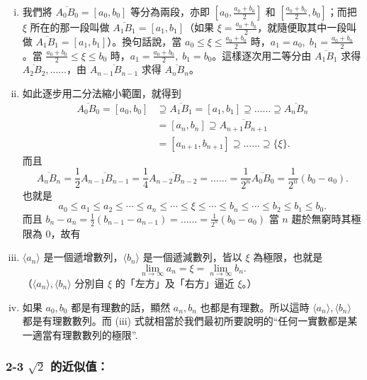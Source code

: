 \begin{enumerate}[(i)]
    \item 我們將 $\overline{A_0 B_0}=[a_0, b_0]$ 等分為兩段，亦即 $[a_0, \frac{a_0+b_0}{2}]$ 和 $[\frac{a_0+b_0}{2}, b_0]$；而把 $\xi$ 所在的那一段叫做 $\overline{A_1 B_1}=[a_1, b_1]$（如果 $\xi = \frac{a_0+b_0}{2}$，就隨便取其中一段叫做 $\overline{A_1 B_1}=[a_1, b_1]$）。換句話說，當 $a_0 \le \xi \le \frac{a_0+b_0}{2}$ 時，$a_1 = a_0,\; b_1 = \frac{a_0+b_0}{2}$。當 $\frac{a_0+b_0}{2} \le \xi \le b_0$ 時，$a_1 = \frac{a_0+b_0}{2},\; b_1 = b_0$。這樣逐次用二等分由 $\overline{A_1 B_1}$ 求得 $\overline{A_2 B_2}, \dots\dots$，由 $\overline{A_{n-1} B_{n-1}}$ 求得 $\overline{A_n B_n}$。
    \item 如此逐步用二分法縮小範圍，就得到
    \begin{align*}
    \overline{A_0 B_0} = [a_0, b_0] &\supseteq \overline{A_1 B_1} = [a_1, b_1] \supseteq \dots\dots \supseteq \overline{A_n B_n} \\
    &= [a_n, b_n] \supseteq \overline{A_{n+1} B_{n+1}} \\
    &= [a_{n+1}, b_{n+1}] \supseteq \dots\dots \supseteq \{\xi\}.
    \end{align*}
    而且
    \[
    \overline{A_n B_n} = \frac{1}{2}\overline{A_{n-1} B_{n-1}} = \frac{1}{4}\overline{A_{n-2} B_{n-2}} = \dots\dots = \frac{1}{2^n}\overline{A_0 B_0} = \frac{1}{2^n}(b_0 - a_0).
    \]
    也就是
    \[
    a_0 \le a_1 \le a_2 \le \cdots \le a_n \le \cdots \le \xi \le \cdots \le b_n \le \cdots \le b_2 \le b_1 \le b_0.
    \]
    而且 $b_n - a_n = \frac{1}{2}(b_{n-1}-a_{n-1}) = \dots\dots = \frac{1}{2^n}(b_0-a_0)$ 當 $n$ 趨於無窮時其極限為 0，故有
    \item[(iii)] $\langle a_n \rangle$ 是一個遞增數列，$\langle b_n \rangle$ 是一個遞減數列，皆以 $\xi$ 為極限，也就是
    \[
    \lim_{n\to\infty} a_n = \xi = \lim_{n\to\infty} b_n.
    \]
    （$\langle a_n \rangle, \langle b_n \rangle$ 分別自 $\xi$ 的「左方」及「右方」逼近 $\xi$。）
    \item[(iv)] 如果 $a_0, b_0$ 都是有理數的話，顯然 $a_n, b_n$ 也都是有理數。所以這時 $\langle a_n \rangle, \langle b_n \rangle$ 都是有理數數列。而 (iii) 式就相當於我們最初所要說明的“任何一實數都是某一適當有理數數列的極限”.
\end{enumerate}

\subsubsection*{2-3 $\sqrt{2}$ 的近似值：}

